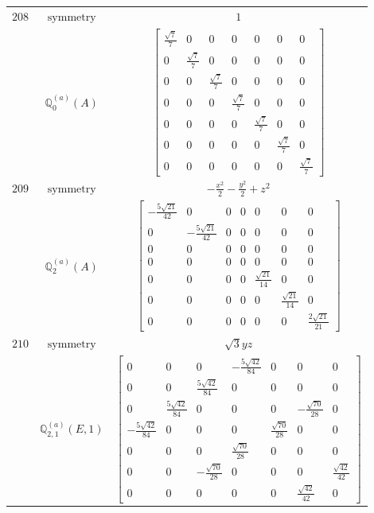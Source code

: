 \documentclass[fleqn,8pt,landscape]{jsarticle}
\begin{document}
\begin{longtable}{ccc}
$ 208 $ & $ \text{symmetry} $ & $ 1 $ \\
$  $ & $ \mathbb{Q}_{0}^{(a)}(A) $ & $ \begin{bmatrix} \frac{\sqrt{7}}{7} & 0 & 0 & 0 & 0 & 0 & 0 \\ 0 & \frac{\sqrt{7}}{7} & 0 & 0 & 0 & 0 & 0 \\ 0 & 0 & \frac{\sqrt{7}}{7} & 0 & 0 & 0 & 0 \\ 0 & 0 & 0 & \frac{\sqrt{7}}{7} & 0 & 0 & 0 \\ 0 & 0 & 0 & 0 & \frac{\sqrt{7}}{7} & 0 & 0 \\ 0 & 0 & 0 & 0 & 0 & \frac{\sqrt{7}}{7} & 0 \\ 0 & 0 & 0 & 0 & 0 & 0 & \frac{\sqrt{7}}{7} \end{bmatrix} $ \\ \hline
$ 209 $ & $ \text{symmetry} $ & $ - \frac{x^{2}}{2} - \frac{y^{2}}{2} + z^{2} $ \\
$  $ & $ \mathbb{Q}_{2}^{(a)}(A) $ & $ \begin{bmatrix} - \frac{5 \sqrt{21}}{42} & 0 & 0 & 0 & 0 & 0 & 0 \\ 0 & - \frac{5 \sqrt{21}}{42} & 0 & 0 & 0 & 0 & 0 \\ 0 & 0 & 0 & 0 & 0 & 0 & 0 \\ 0 & 0 & 0 & 0 & 0 & 0 & 0 \\ 0 & 0 & 0 & 0 & \frac{\sqrt{21}}{14} & 0 & 0 \\ 0 & 0 & 0 & 0 & 0 & \frac{\sqrt{21}}{14} & 0 \\ 0 & 0 & 0 & 0 & 0 & 0 & \frac{2 \sqrt{21}}{21} \end{bmatrix} $ \\ \hline
$ 210 $ & $ \text{symmetry} $ & $ \sqrt{3} y z $ \\
$  $ & $ \mathbb{Q}_{2,1}^{(a)}(E,1) $ & $ \begin{bmatrix} 0 & 0 & 0 & - \frac{5 \sqrt{42}}{84} & 0 & 0 & 0 \\ 0 & 0 & \frac{5 \sqrt{42}}{84} & 0 & 0 & 0 & 0 \\ 0 & \frac{5 \sqrt{42}}{84} & 0 & 0 & 0 & - \frac{\sqrt{70}}{28} & 0 \\ - \frac{5 \sqrt{42}}{84} & 0 & 0 & 0 & \frac{\sqrt{70}}{28} & 0 & 0 \\ 0 & 0 & 0 & \frac{\sqrt{70}}{28} & 0 & 0 & 0 \\ 0 & 0 & - \frac{\sqrt{70}}{28} & 0 & 0 & 0 & \frac{\sqrt{42}}{42} \\ 0 & 0 & 0 & 0 & 0 & \frac{\sqrt{42}}{42} & 0 \end{bmatrix} $ \\ \hline

\end{longtable}
\end{document}

